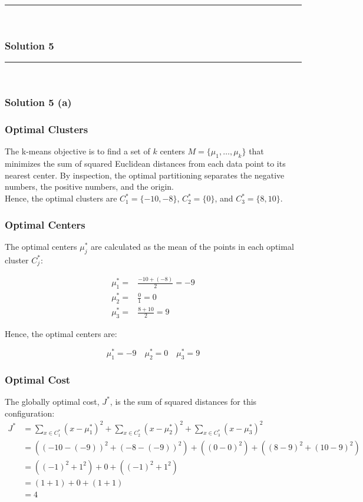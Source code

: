 \documentclass{article}
\begin{document}
\noindent\rule{\textwidth}{0.4pt}\\

\newpage

\subsubsection*{Solution 5}
\noindent\rule{\textwidth}{0.4pt}\\
\subsubsection*{Solution 5 (a)}
\subsubsection*{Optimal Clusters}
\begin{flushleft}
The k-means objective is to find a set of $k$ centers $M=\{\mu_1, \dots, \mu_k\}$ that minimizes the sum of squared Euclidean distances from each data point to its nearest center. By inspection, the optimal partitioning separates the negative numbers, the positive numbers, and the origin. \\
\vspace{0.25cm}
Hence, the optimal clusters are $C_1^* = \{-10, -8\}$, $C_2^* = \{0\}$, and $C_3^* = \{8, 10\}$.
\end{flushleft}

\subsubsection*{Optimal Centers}
The optimal centers $\mu_j^*$ are calculated as the mean of the points in each optimal cluster $C_j^*$:

\begin{align*}
\mu_1^* = &\frac{-10 + (-8)}{2} = -9 \\
\mu_2^* = &\frac{0}{1} = 0 \\
\mu_3^* = &\frac{8 + 10}{2} = 9
\end{align*}

\vspace{0.25cm}

Hence, the optimal centers are:

$$\mu_1^* = -9 \quad \mu_2^* = 0 \quad \mu_3^* = 9$$

\subsubsection*{Optimal Cost}
The globally optimal cost, $J^*$, is the sum of squared distances for this configuration:
\begin{align*}
    J^* &= \sum_{x \in C_1^*} (x - \mu_1^*)^2 + \sum_{x \in C_2^*} (x - \mu_2^*)^2 + \sum_{x \in C_3^*} (x - \mu_3^*)^2 \\
    &= \left( (-10 - (-9))^2 + (-8 - (-9))^2 \right) + \left( (0 - 0)^2 \right) + \left( (8 - 9)^2 + (10 - 9)^2 \right) \\
    &= \left( (-1)^2 + 1^2 \right) + 0 + \left( (-1)^2 + 1^2 \right) \\
    &= (1 + 1) + 0 + (1 + 1) \\
    &= 4
\end{align*}
\end{document}
